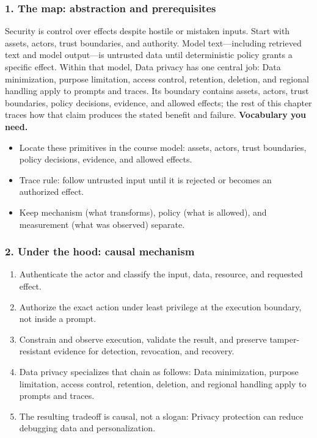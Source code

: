 \subsubsection*{1. The map: abstraction and prerequisites}
Security is control over effects despite hostile or mistaken inputs. Start with assets, actors, trust boundaries, and authority. Model text—including retrieved text and model output—is untrusted data until deterministic policy grants a specific effect.
Within that model, Data privacy has one central job: Data minimization, purpose limitation, access control, retention, deletion, and regional handling apply to prompts and traces. Its boundary contains assets, actors, trust boundaries, policy decisions, evidence, and allowed effects; the rest of this chapter traces how that claim produces the stated benefit and failure.
\textbf{Vocabulary you need.}\begin{itemize}
\item Locate these primitives in the course model: assets, actors, trust boundaries, policy decisions, evidence, and allowed effects.
\item Trace rule: follow untrusted input until it is rejected or becomes an authorized effect.
\item Keep mechanism (what transforms), policy (what is allowed), and measurement (what was observed) separate.
\end{itemize}
\subsubsection*{2. Under the hood: causal mechanism}\begin{enumerate}
\item Authenticate the actor and classify the input, data, resource, and requested effect.
\item Authorize the exact action under least privilege at the execution boundary, not inside a prompt.
\item Constrain and observe execution, validate the result, and preserve tamper-resistant evidence for detection, revocation, and recovery.
\item Data privacy specializes that chain as follows: Data minimization, purpose limitation, access control, retention, deletion, and regional handling apply to prompts and traces.
\item The resulting tradeoff is causal, not a slogan: Privacy protection can reduce debugging data and personalization.
\end{enumerate}
